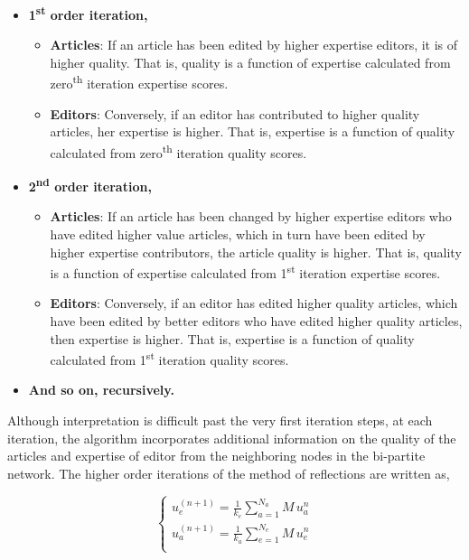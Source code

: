 \begin{itemize}
  \item {\bf 1\textsuperscript{st} order iteration,}  
  \begin{itemize}
  \item {\bf Articles}: If an article has been edited by higher expertise editors, it is of higher quality. That is, quality is a function of expertise calculated from zero\textsuperscript{th} iteration expertise scores.
  \item {\bf Editors}: Conversely, if an editor has contributed to higher quality articles, her expertise is higher. That is, expertise is a function of quality calculated from zero\textsuperscript{th} iteration quality scores.
  \end{itemize}
  \pagebreak
  \item {\bf 2\textsuperscript{nd} order iteration,}
    \begin{itemize}
  \item {\bf  Articles}: If an article has been changed by higher expertise editors who have edited higher value articles, which in turn have been edited by higher expertise contributors, the article quality is higher. That is, quality is a function of expertise calculated from 1\textsuperscript{st} iteration expertise scores.
  \item {\bf Editors}: Conversely, if an editor has edited higher quality articles, which have been edited by better editors who have edited higher quality articles, then expertise is higher. That is, expertise is a function of quality calculated from 1\textsuperscript{st} iteration quality scores.
  \end{itemize}
 \item {\bf And so on, recursively.}\\
\end{itemize}

Although interpretation is difficult past the very first iteration steps, at each iteration, the algorithm incorporates additional information on the quality of the articles and expertise of editor from the neighboring nodes in the bi-partite network. The higher order iterations of the method of reflections are written as,

\begin{equation}
\begin{cases}
 u_{e}^{(n+1)} = \frac{1}{k_{e}}\sum_{a=1}^{N_{a}} M \, u_{a}^{n}\\[7pt]
 u_{a}^{(n+1)} = \frac{1}{k_{a}}\sum_{e=1}^{N_{e}} M \, u_{e}^{n}\\
\end{cases}
\label{HHhigher}
\end{equation}

